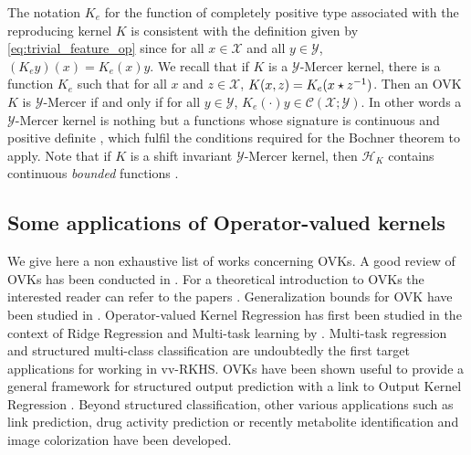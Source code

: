 \documentclass[twoside,11pt]{article}
\begin{document}
The notation $K_e$ for the function of completely positive type associated with
the reproducing kernel $K$ is consistent with the definition given by
\cref{eq:trivial_feature_op} since for all $x\in\mathcal{X}$ and all
$y\in\mathcal{Y}$, $(K_ey)(x)=K_e(x)y$.  We recall that if $K$ is a
$\mathcal{Y}$-Mercer kernel, there is a function $K_e$ such that for all $x$
and $z\in\mathcal{X}$, $K(x, z)=K_e(x\star z^{-1})$. Then an \acs{OVK} $K$
is $\mathcal{Y}$-Mercer if and only if for all $y\in\mathcal{Y}$,
$K_e(\cdot)y\in\mathcal{C}(\mathcal{X};\mathcal{Y})$. In other words a
$\mathcal{Y}$-Mercer kernel is nothing but a functions whose signature is
continuous and positive definite \citep{Carmeli2010}, which fulfil the
conditions required for the  Bochner theorem to apply.
Note that if $K$ is a shift invariant $\mathcal{Y}$-Mercer kernel, then
$\mathcal{H}_K$ contains continuous \emph{bounded} functions
\citep{Carmeli2010}.
\subsection{Some applications of Operator-valued kernels}
We give here a non exhaustive list of works concerning \aclp{OVK}.  A good
review of \aclp{OVK} has been conducted in \citet{Alvarez2012}. For a
theoretical introduction to \acsp{OVK} the interested reader can refer to the
papers \citet{carmeli2006vector, caponnetto2008, Carmeli2010}. Generalization
bounds for \acs{OVK} have been studied in \citet{Sindhwani2013,
kadri2015operator,sangnier2016joint, maurer2016vector}.  Operator-valued Kernel
Regression has first been studied in the context of Ridge Regression and
Multi-task learning by \citet{Micchelli2005}.  Multi-task regression
\citep{micchelli2004kernels}  and structured multi-class classification
\citep{Dinuzzo2011,minh2013unifying,mroueh2012multiclass} are undoubtedly the
first target applications for working in \acl{vv-RKHS}.  \aclp{OVK} have been
shown useful to provide a general framework for structured output prediction
\citep{Brouard2011,Brouard2016_jmlr} with a link to Output Kernel Regression
\citep{Kadri_icml2013}. Beyond structured classification, other various
applications such as link prediction, drug activity prediction or recently
metabolite identification \citep{brouard2016fast} and  image colorization
\citep{ha2010image} have been developed.
\end{document}

